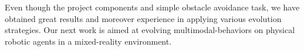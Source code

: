 \documentclass[format=acmsmall, review=false, screen=true]{acmart}
\begin{document}
Even though the project components and simple obstacle avoidance task, we have obtained great results and moreover experience in applying various evolution strategies. Our next work is aimed at evolving multimodal-behaviors on physical robotic agents in a mixed-reality environment.

\medskip

\newpage


\end{document}
